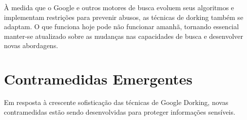 \documentclass[12pt,a4paper]{book}
\begin{document}
\begin{notebox}
À medida que o Google e outros motores de busca evoluem seus algoritmos e implementam restrições para prevenir abusos, as técnicas de dorking também se adaptam. O que funciona hoje pode não funcionar amanhã, tornando essencial manter-se atualizado sobre as mudanças nas capacidades de busca e desenvolver novas abordagens.
\end{notebox}

\section{Contramedidas Emergentes}

Em resposta à crescente sofisticação das técnicas de Google Dorking, novas contramedidas estão sendo desenvolvidas para proteger informações sensíveis.
\end{document}
